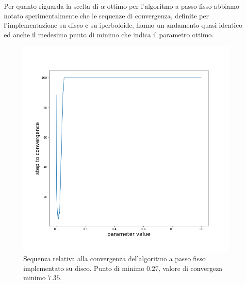 \documentclass[a4paper, 12pt]{article}
\begin{document}
Per quanto riguarda la scelta di $\alpha$ ottimo per l'algoritmo a passo fisso abbiamo notato sperimentalmente che le sequenze di convergenza, definite per l'implementazione su disco e su iperboloide, hanno un andamento quasi identico ed anche il medesimo punto di minimo che indica il parametro ottimo.\\
\begin{figure}[H] %
    \centering\includegraphics[width=1\textwidth]{fixed_step_parameter_poincare.png}
    \caption{Sequenza relativa alla convergenza del'algoritmo a passo fisso implementato su disco. Punto di minimo $0.27$, valore di convergeza minimo $7.35$.}
\end{figure}
\end{document}
